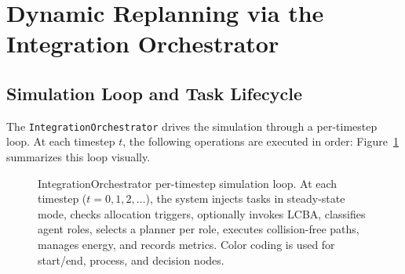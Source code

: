 \section{Dynamic Replanning via the Integration Orchestrator}
\label{sec:method_dynamic}


\subsection{Simulation Loop and Task Lifecycle}
\label{subsec:method_loop}

The \texttt{IntegrationOrchestrator} drives the simulation through a
per-timestep loop.
At each timestep $t$, the following operations are executed in order:
Figure~\ref{fig:io_flowchart} summarizes this loop visually.

\begin{figure}[htbp]
  \centering
  \resizebox{0.92\linewidth}{!}{}

  \caption{IntegrationOrchestrator per-timestep simulation loop. At each
           timestep ($t = 0, 1, 2, \ldots$), the system injects tasks in
           steady-state mode, checks allocation triggers, optionally invokes
           LCBA, classifies agent roles, selects a planner per role, executes
           collision-free paths, manages energy, and records metrics. Color
           coding is used for start/end, process, and decision nodes.}
  \label{fig:io_flowchart}
\end{figure}

